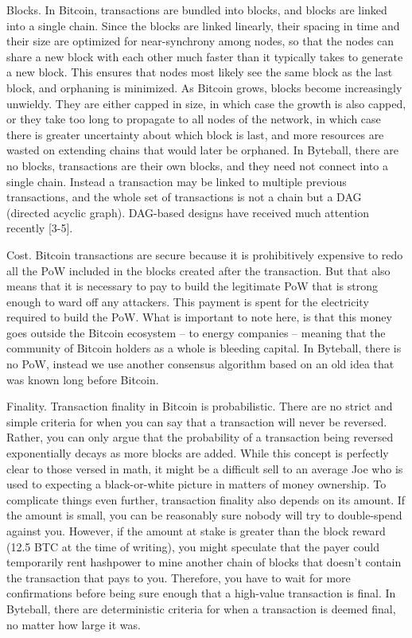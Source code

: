 \documentclass[a4paper, dvipdfmx]{jsarticle}
\begin{document}
Blocks. In Bitcoin, transactions are bundled into blocks, and blocks are linked into a single chain. Since the blocks are linked linearly, their spacing in time and their size are optimized for near-synchrony among nodes, so that the nodes can share a new block with each other much faster than it typically takes to generate a new block. This ensures that nodes most likely see the same block as the last block, and orphaning is minimized. As Bitcoin grows, blocks become increasingly unwieldy. They are either capped in size, in which case the growth is also capped, or they take too long to propagate to all nodes of the network, in which case there is greater uncertainty about which block is last, and more resources are wasted on extending chains that would later be orphaned. In Byteball, there are no blocks, transactions are their own blocks, and they need not connect into a single chain. Instead a transaction may be linked to multiple previous transactions, and the whole set of transactions is not a chain but a DAG (directed acyclic graph). DAG-based designs have received much attention recently [3-5].

Cost. Bitcoin transactions are secure because it is prohibitively expensive to redo all the PoW included in the blocks created after the transaction. But that also means that it is necessary to pay to build the legitimate PoW that is strong enough to ward off any attackers. This payment is spent for the electricity required to build the PoW. What is important to note here, is that this money goes outside the Bitcoin ecosystem – to energy companies – meaning that the community of Bitcoin holders as a whole is bleeding capital. In Byteball, there is no PoW, instead we use another consensus algorithm based on an old idea that was known long before Bitcoin.

Finality. Transaction finality in Bitcoin is probabilistic. There are no strict and simple criteria for when you can say that a transaction will never be reversed. Rather, you can only argue that the probability of a transaction being reversed exponentially decays as more blocks are added. While this concept is perfectly clear to those versed in math, it might be a difficult sell to an average Joe who is used to expecting a black-or-white picture in matters of money ownership. To complicate things even further, transaction finality also depends on its amount. If the amount is small, you can be reasonably sure nobody will try to double-spend against you. However, if the amount at stake is greater than the block reward (12.5 BTC at the time of writing), you might speculate that the payer could temporarily rent hashpower to mine another chain of blocks that doesn’t contain the transaction that pays to you. Therefore, you have to wait for more confirmations before being sure enough that a high-value transaction is final. In Byteball, there are deterministic criteria for when a transaction is deemed final, no matter how large it was.
\end{document}
